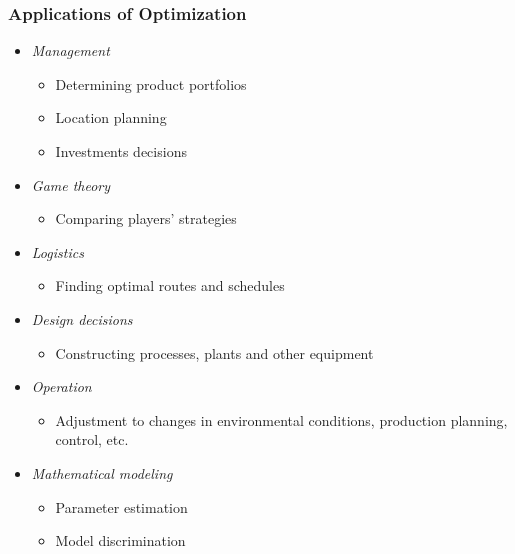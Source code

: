 \documentclass[%
  final,
  11pt, 
  show notes, %
  t, %
  fleqn, %
]{beamer}
\begin{document}
\begin{frame}[fragile]
  \frametitle{Applications of Optimization}
\begin{itemize}
\item \emph{Management} 
\begin{itemize}
\item Determining product portfolios
\item Location planning
\item Investments decisions
\end{itemize}
\item \emph{Game theory} 
\begin{itemize}
\item Comparing players' strategies
\end{itemize}
\item \emph{Logistics} 
\begin{itemize}
\item Finding optimal routes and schedules
\end{itemize}
\item \emph{Design decisions} 
\begin{itemize}
\item Constructing processes, plants and other equipment
\end{itemize}
\item \emph{Operation} 
\begin{itemize}
\item Adjustment to changes in environmental conditions, production planning, control, etc.
\end{itemize}
\item \emph{Mathematical modeling} 
\begin{itemize}
\item Parameter estimation
\item Model discrimination
\end{itemize} 
\end{itemize}
\end{frame}
\end{document}
